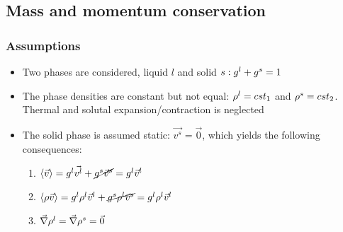 \subsection{Mass and momentum conservation}
\subsubsection{Assumptions}
\begin{itemize}
\itemsep0em
\item Two phases are considered, liquid $l$ and solid $s: {g^l}+{g^s} =1 $ %
\item The phase densities are constant but not equal: $ \rho^l=cst_1 $ and $ \rho^s=cst_2 $. Thermal and solutal expansion/contraction
is neglected
\item The solid phase is assumed static: $\vec{v^s}=\vec{0}$, which yields the following consequences:
\begin{enumerate} %
\itemsep0em
\item $ \langle \vec{v} \rangle= {g^l} \vec{v^l} + \cancel{{g^s} \vec{v}^s} = {g^l} \vec{v}^l $
\item $ \langle \rho \vec{v} \rangle = {g^l} \rho^l \vec{v}^l + \cancel{{g^s} \rho^l \vec{v}^s} = {g^l} \rho^l \vec{v}^l $
\item $\vec{\nabla} \rho^l = \vec{\nabla} \rho^s = \vec{0}$
\end{enumerate}
\end{itemize}
